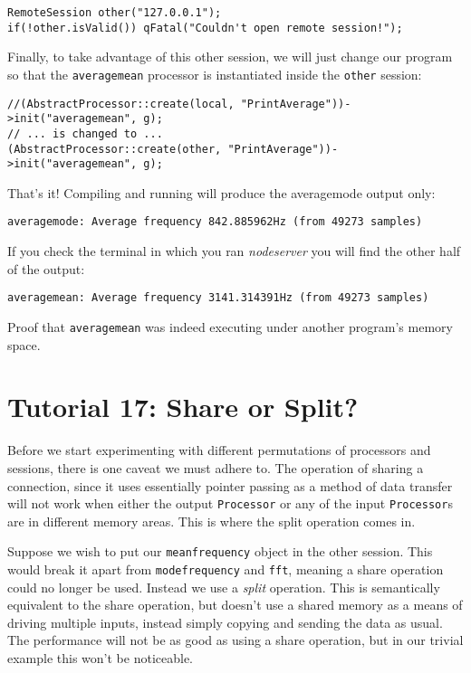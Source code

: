 \begin{verbatim}
RemoteSession other("127.0.0.1");
if(!other.isValid()) qFatal("Couldn't open remote session!");
\end{verbatim}

Finally, to take advantage of this other session, we will just change our program so that the \texttt{averagemean} processor is instantiated inside the \texttt{other} session:

\begin{verbatim}
//(AbstractProcessor::create(local, "PrintAverage"))->init("averagemean", g);
// ... is changed to ...
(AbstractProcessor::create(other, "PrintAverage"))->init("averagemean", g);
\end{verbatim}

That's it! Compiling and running will produce the averagemode output only:

\begin{verbatim}
averagemode: Average frequency 842.885962Hz (from 49273 samples)
\end{verbatim}

If you check the terminal in which you ran \textit{nodeserver} you will find the other half of the output:

\begin{verbatim}
averagemean: Average frequency 3141.314391Hz (from 49273 samples)
\end{verbatim}

Proof that \texttt{averagemean} was indeed executing under another program's memory space.




\section{Tutorial 17: Share or Split?}

Before we start experimenting with different permutations of processors and sessions, there is one caveat we must adhere to. The operation of sharing a connection, since it uses essentially pointer passing as a method of data transfer will not work when either the output \texttt{Processor} or any of the input \texttt{Processor}s are in different memory areas. This is where the split operation comes in.

Suppose we wish to put our \texttt{meanfrequency} object in the other session. This would break it apart from \texttt{modefrequency} and \texttt{fft}, meaning a share operation could no longer be used. Instead we use a \textit{split} operation. This is semantically equivalent to the share operation, but doesn't use a shared memory as a means of driving multiple inputs, instead simply copying and sending the data as usual. The performance will not be as good as using a share operation, but in our trivial example this won't be noticeable.

